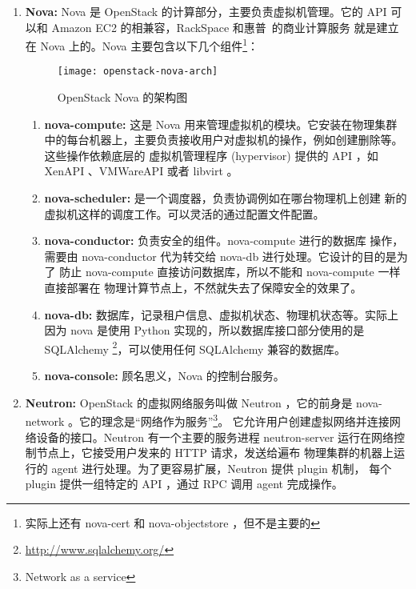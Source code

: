 \begin{enumerate}
    \item \textbf{Nova:} Nova 是 OpenStack 的计算部分，主要负责虚拟机管理。它的 API
    可以和 Amazon EC2 的相兼容，RackSpace 和惠普~\cite{hpe-openstack}的商业计算服务
    就是建立在 Nova 上的。Nova 主要包含以下几个组件\footnote{实际上还有 nova-cert
     和 nova-objectstore ，但不是主要的}：
    \begin{figure}[h]
        \centering
        \texttt{[image: openstack-nova-arch]}
        \caption{OpenStack Nova 的架构图}
    \end{figure}
    \begin{enumerate}
        \item \textbf{nova-compute:} 这是 Nova 用来管理虚拟机的模块。它安装在物理集群
        中的每台机器上，主要负责接收用户对虚拟机的操作，例如创建删除等。这些操作依赖底层的
        虚拟机管理程序 (hypervisor) 提供的 API ，如 XenAPI 、VMWareAPI
         或者 libvirt 。
        \item \textbf{nova-scheduler:} 是一个调度器，负责协调例如在哪台物理机上创建
        新的虚拟机这样的调度工作。可以灵活的通过配置文件配置。
        \item \textbf{nova-conductor:} 负责安全的组件。nova-compute 进行的数据库
        操作，需要由 nova-conductor 代为转交给 nova-db 进行处理。它设计的目的是为了
        防止 nova-compute 直接访问数据库，所以不能和 nova-compute 一样直接部署在
        物理计算节点上，不然就失去了保障安全的效果了。~\cite{conductor}
        \item \textbf{nova-db:} 数据库，记录租户信息、虚拟机状态、物理机状态等。实际上
        因为 nova 是使用 Python 实现的，所以数据库接口部分使用的是 SQLAlchemy
         \footnote{\url{http://www.sqlalchemy.org/}}，可以使用任何 SQLAlchemy
         兼容的数据库。
        \item \textbf{nova-console:} 顾名思义，Nova 的控制台服务。
    \end{enumerate}
    \item \textbf{Neutron:} OpenStack 的虚拟网络服务叫做 Neutron ，它的前身是
     nova-network 。它的理念是“网络作为服务”\footnote{Network as a service}。
    它允许用户创建虚拟网络并连接网络设备的接口。Neutron 有一个主要的服务进程
     neutron-server 运行在网络控制节点上，它接受用户发来的 HTTP 请求，发送给遍布
    物理集群的机器上运行的 agent 进行处理。为了更容易扩展，Neutron 提供 plugin 机制，
    每个 plugin 提供一组特定的 API ，通过 RPC 调用 agent 完成操作。
    \begin{figure}[h]

\end{figure}
\end{enumerate}
